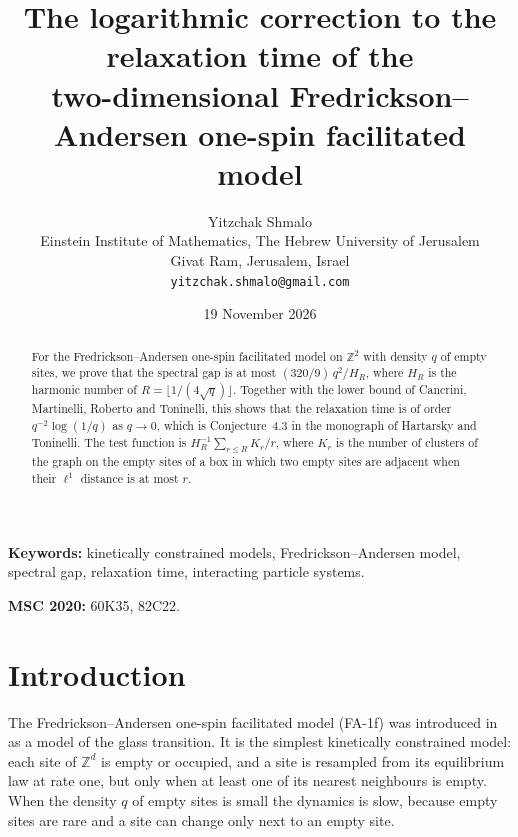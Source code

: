 \documentclass[11pt]{article}
\title{The logarithmic correction to the relaxation time of the\\
two-dimensional Fredrickson--Andersen one-spin facilitated model}
\author{Yitzchak Shmalo\\
Einstein Institute of Mathematics, The Hebrew University of Jerusalem\\
Givat Ram, Jerusalem, Israel\\
\texttt{yitzchak.shmalo@gmail.com}}
\date{19 November 2026}
\theoremstyle{remark}
\newcommand{\Z}{\mathbb Z}
\newcommand{\1}{\mathbf 1}
\begin{document}
\maketitle

\begin{abstract}
For the Fredrickson--Andersen one-spin facilitated model on $\Z^2$ with density $q$ of empty sites, we prove that the spectral gap is at most $(320/9)\,q^2/H_R$, where $H_R$ is the harmonic number of $R=\lfloor 1/(4\sqrt q)\rfloor$. Together with the lower bound of Cancrini, Martinelli, Roberto and Toninelli, this shows that the relaxation time is of order $q^{-2}\log(1/q)$ as $q\to0$, which is Conjecture~4.3 in the monograph of Hartarsky and Toninelli. The test function is $H_R^{-1}\sum_{r\le R}K_r/r$, where $K_r$ is the number of clusters of the graph on the empty sites of a box in which two empty sites are adjacent when their $\ell^1$ distance is at most $r$.
\end{abstract}

\noindent\textbf{Keywords:} kinetically constrained models, Fredrickson--Andersen model, spectral gap, relaxation time, interacting particle systems.

\noindent\textbf{MSC 2020:} 60K35, 82C22.

\section{Introduction}

The Fredrickson--Andersen one-spin facilitated model (FA-1f) was introduced in \cite{FA} as a model of the glass transition. It is the simplest kinetically constrained model: each site of $\Z^d$ is empty or occupied, and a site is resampled from its equilibrium law at rate one, but only when at least one of its nearest neighbours is empty. When the density $q$ of empty sites is small the dynamics is slow, because empty sites are rare and a site can change only next to an empty site.
\end{document}
